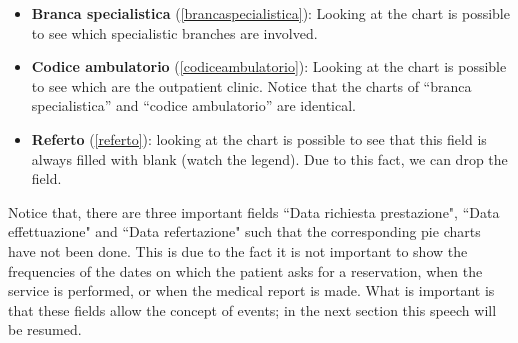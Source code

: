 \documentclass[paper=a4, fontsize=11pt]{scrartcl} %
\numberwithin{equation}{section} %
\numberwithin{figure}{section} %
\numberwithin{table}{section} %
\begin{document}
\begin{itemize}
\item \textbf{Branca specialistica} (\ref{brancaspecialistica}): Looking at the chart is possible to see which specialistic branches are involved.
\item \textbf{Codice ambulatorio} (\ref{codiceambulatorio}): Looking at the chart is possible to see which are the outpatient clinic. Notice that the charts of ``branca specialistica'' and ``codice ambulatorio'' are identical.
\item \textbf{Referto} (\ref{referto}): looking at the chart is possible to see that this field is always filled with blank (watch the legend). Due to this fact, we can drop the field. 
\end{itemize}
Notice that, there are three important fields ``Data richiesta prestazione", ``Data effettuazione" and ``Data refertazione" such that the corresponding pie charts have not been done. This is due to the fact it is not important to show the frequencies of the dates on which the patient asks for a reservation, when the service is performed, or when the medical report is made. What is important is that these fields allow the concept of events; in the next section this speech will be resumed.
\newpage
\end{document}

